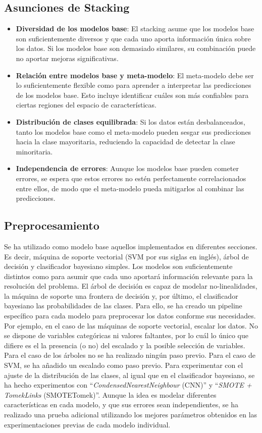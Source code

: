 \documentclass[12pt,letterpaper]{article}
\begin{document}
\subsection{Asunciones de Stacking}
\begin{itemize}
    \item \textbf{Diversidad de los modelos base}: El stacking asume que los modelos base son suficientemente diversos y que cada uno aporta información única sobre los datos. Si los modelos base son demasiado similares, su combinación puede no aportar mejoras significativas.
    \item \textbf{Relación entre modelos base y meta-modelo}: El meta-modelo debe ser lo suficientemente flexible como para aprender a interpretar las predicciones de los modelos base. Esto incluye identificar cuáles son más confiables para ciertas regiones del espacio de características.
    \item \textbf{Distribución de clases equilibrada}: Si los datos están desbalanceados, tanto los modelos base como el meta-modelo pueden sesgar sus predicciones hacia la clase mayoritaria, reduciendo la capacidad de detectar la clase minoritaria.
    \item \textbf{Independencia de errores}: Aunque los modelos base pueden cometer errores, se espera que estos errores no estén perfectamente correlacionados entre ellos, de modo que el meta-modelo pueda mitigarlos al combinar las predicciones.
\end{itemize}
\subsection{Preprocesamiento}
Se ha utilizado como modelo base aquellos implementados en diferentes secciones. Es decir, máquina de soporte vectorial (SVM por sus siglas en inglés), árbol de decisión y clasificador bayesiano simples. 
Los modelos son suficientemente distintos como para asumir que cada uno aportará información relevante para la resolución del problema. El árbol de decisión es capaz de modelar no-linealidades, la máquina de soporte una 
frontera de decisión y, por último, el clasificador bayesiano las probabilidades de las clases.
Para ello, se ha creado un pipeline específico para cada modelo para preprocesar los datos conforme sus necesidades. Por ejemplo, en el caso de las máquinas de soporte vectorial, escalar los datos. 
No se dispone de variables categóricas ni valores faltantes, por lo cuál lo único que difiere es el la presencia (o no) del escalado y la posible selección de variables.
Para el caso de los árboles no se ha realizado ningún paso previo. Para el caso de SVM, se ha añadido un escalado como paso previo. 
Para experimentar con el ajuste de la distribución de las clases, al igual que en el clasificador bayesiano, se ha hecho experimentos con ``\textit{CondensedNearestNeighbour} (CNN)'' y ``\textit{SMOTE + TomekLinks} (SMOTETomek)''.
Aunque la idea es modelar diferentes características en cada modelo, y que sus errores sean independientes, se ha realizado una prueba adicional utilizando los mejores parámetros obtenidos en las experimentaciones previas de cada modelo individual.
\end{document}
